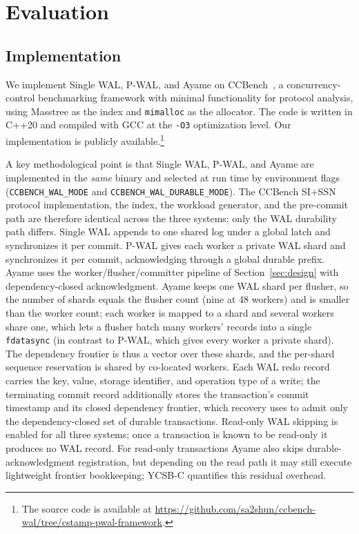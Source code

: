 \section{Evaluation}
\label{sec:evaluation}

\subsection{Implementation}
\label{sec:impl}

We implement Single WAL, P-WAL, and Ayame on
CCBench~\cite{tanabe2020ccbench}, a concurrency-control benchmarking
framework with minimal functionality for protocol analysis, using
Masstree as the index and \texttt{mimalloc} as the allocator.  The code
is written in C++20 and compiled with GCC at the \texttt{-O3}
optimization level.  Our implementation is publicly
available.\footnote{The source code is available at
\url{https://github.com/sa2shun/ccbench-wal/tree/cstamp-pwal-framework}.}

A key methodological point is that Single WAL, P-WAL, and Ayame are
implemented in the \emph{same} binary and selected at run time by
environment flags (\texttt{CCBENCH\_WAL\_MODE} and
\texttt{CCBENCH\_WAL\_DURABLE\_MODE}).  The CCBench SI+SSN protocol
implementation, the index, the workload generator, and the pre-commit
path are therefore identical across the three systems; only the WAL
durability path differs.
Single WAL appends to one shared log under a global latch and
synchronizes it per commit.  P-WAL gives each worker a private WAL shard
and synchronizes it per commit, acknowledging through a global durable
prefix.  Ayame uses the worker/flusher/committer pipeline of
Section~\ref{sec:design} with dependency-closed acknowledgment.  Ayame keeps
one WAL shard per flusher, so the number of shards equals the flusher count
(nine at 48 workers) and is smaller than the worker count; each worker is
mapped to a shard and several workers share one, which lets a flusher batch
many workers' records into a single \texttt{fdatasync} (in contrast to P-WAL,
which gives every worker a private shard).  The dependency frontier is thus a
vector over these shards, and the per-shard sequence reservation is shared by
co-located workers.  Each WAL
redo record carries the key, value, storage identifier, and operation
type of a write; the terminating commit record additionally stores the
transaction's commit timestamp and its closed dependency frontier, which
recovery uses to admit only the dependency-closed set of durable
transactions.  Read-only WAL skipping is
enabled for all three systems; once a transaction is known to be
read-only it produces no WAL record.  For read-only transactions Ayame
also skips durable-acknowledgment registration, but depending on the
read path it may still execute lightweight frontier bookkeeping; YCSB-C
quantifies this residual overhead.

